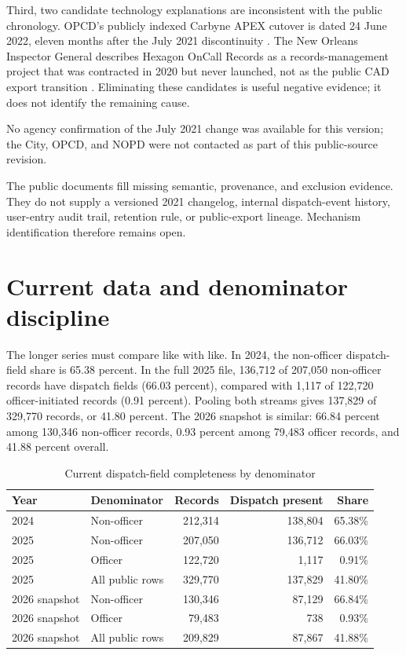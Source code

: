 \documentclass[11pt]{article}
\begin{document}
Third, two candidate technology explanations are inconsistent with the public chronology. OPCD's publicly indexed Carbyne APEX cutover is dated 24 June 2022, eleven months after the July 2021 discontinuity \citep{OPCDCarbyne2022}. The New Orleans Inspector General describes Hexagon OnCall Records as a records-management project that was contracted in 2020 but never launched, not as the public CAD export transition \citep{NOLAOIGHexagon2024}. Eliminating these candidates is useful negative evidence; it does not identify the remaining cause.

No agency confirmation of the July 2021 change was available for this version; the City, OPCD, and NOPD were not contacted as part of this public-source revision.

\begin{warningbox}[title=Institutional-evidence boundary]
The public documents fill missing semantic, provenance, and exclusion evidence. They do not supply a versioned 2021 changelog, internal dispatch-event history, user-entry audit trail, retention rule, or public-export lineage. Mechanism identification therefore remains open.
\end{warningbox}

\section{Current data and denominator discipline}

The longer series must compare like with like. In 2024, the non-officer dispatch-field share is 65.38 percent. In the full 2025 file, 136,712 of 207,050 non-officer records have dispatch fields (66.03 percent), compared with 1,117 of 122,720 officer-initiated records (0.91 percent). Pooling both streams gives 137,829 of 329,770 records, or 41.80 percent. The 2026 snapshot is similar: 66.84 percent among 130,346 non-officer records, 0.93 percent among 79,483 officer records, and 41.88 percent overall.

\begin{table}[t]
\centering
\caption{Current dispatch-field completeness by denominator}
\label{tab:current}
\begin{tabular}{@{}llrrr@{}}
\toprule
Year & Denominator & Records & Dispatch present & Share \\
\midrule
2024 & Non-officer & 212,314 & 138,804 & 65.38\% \\
2025 & Non-officer & 207,050 & 136,712 & 66.03\% \\
2025 & Officer & 122,720 & 1,117 & 0.91\% \\
2025 & All public rows & 329,770 & 137,829 & 41.80\% \\
2026 snapshot & Non-officer & 130,346 & 87,129 & 66.84\% \\
2026 snapshot & Officer & 79,483 & 738 & 0.93\% \\
2026 snapshot & All public rows & 209,829 & 87,867 & 41.88\% \\
\bottomrule
\end{tabular}
\end{table}
\end{document}

